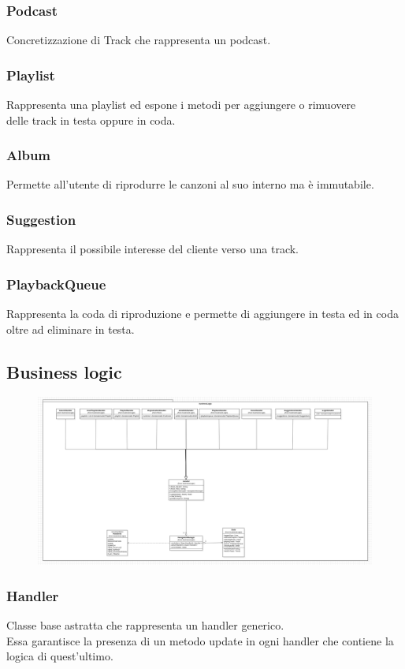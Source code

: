 \documentclass{article}
\begin{document}
\subsubsection{Podcast}
Concretizzazione di Track che rappresenta un podcast.
\subsubsection{Playlist}
Rappresenta una playlist ed espone i metodi per aggiungere o rimuovere\\ delle track in testa oppure in coda.
\subsubsection{Album}
Permette all'utente di riprodurre le canzoni al suo interno ma è immutabile.
\subsubsection{Suggestion}
Rappresenta il possibile interesse del cliente verso una track.
\subsubsection{PlaybackQueue}
Rappresenta la coda di riproduzione e permette di aggiungere in testa ed in coda oltre ad eliminare in testa.



\subsection{Business logic}

\begin{figure}[H]
\includegraphics[scale=0.28]{logic01}
\end{figure}

\subsubsection{Handler}
Classe base astratta che rappresenta un handler generico.\\
Essa garantisce la presenza di un metodo update in ogni handler che contiene la logica di quest'ultimo.
\end{document}
